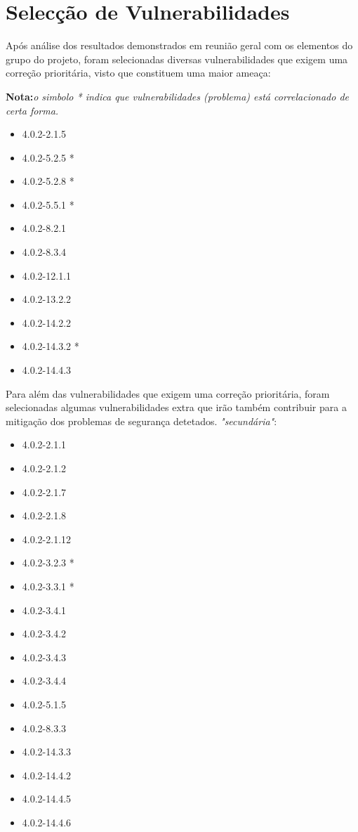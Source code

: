 \section{Selecção de Vulnerabilidades}

Após análise dos resultados demonstrados em reunião geral com os elementos do grupo do projeto, foram selecionadas diversas vulnerabilidades que exigem uma correção prioritária, visto que constituem uma maior ameaça:


\textbf{Nota:}\textit{o simbolo * indica que vulnerabilidades (problema) está correlacionado de certa forma.}

\begin{itemize}
    \item 4.0.2-2.1.5 
    \item 4.0.2-5.2.5 *
    \item 4.0.2-5.2.8 *
    \item 4.0.2-5.5.1 *
    \item 4.0.2-8.2.1
    \item 4.0.2-8.3.4
    \item 4.0.2-12.1.1
    \item 4.0.2-13.2.2
    \item 4.0.2-14.2.2
    \item 4.0.2-14.3.2 *
    \item 4.0.2-14.4.3  
\end{itemize}

Para além das vulnerabilidades que exigem uma correção prioritária, foram selecionadas algumas vulnerabilidades extra que irão também contribuir para a mitigação dos problemas de segurança detetados. \textit{"secundária"}:

\begin{itemize}
    \item 4.0.2-2.1.1
    \item 4.0.2-2.1.2
    \item 4.0.2-2.1.7
    \item 4.0.2-2.1.8
    \item 4.0.2-2.1.12
    \item 4.0.2-3.2.3 *
    \item 4.0.2-3.3.1 *
    \item 4.0.2-3.4.1
    \item 4.0.2-3.4.2
    \item 4.0.2-3.4.3
    \item 4.0.2-3.4.4
    \item 4.0.2-5.1.5
    \item 4.0.2-8.3.3
    \item 4.0.2-14.3.3
    \item 4.0.2-14.4.2
    \item 4.0.2-14.4.5
    \item 4.0.2-14.4.6
\end{itemize}

